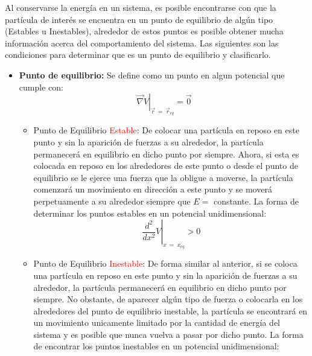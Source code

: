 \documentclass[/home/hernan/Documentos/Apuntes_mecanica_teorica/main.tex]{subfiles}
\begin{document}
	\begin{definition}
		
		Al conservarse la energía en un sistema, es posible encontrarse con que la partícula de interés se encuentra en un punto de equilibrio de algún tipo (Estables u Inestables), alrededor de estos puntos es posible obtener mucha información acerca del comportamiento del sistema. Las siguientes son las condiciones para determinar que es un punto de equilibrio y clasificarlo.

		\begin{itemize}
			\item \textbf{Punto de equilibrio: } Se define como un punto en algun potencial que cumple con: \\ 
				\begin{equation}
				\left .  \vec{\nabla }V \right|_{\vec{r} \: = \: \vec{r}_{eq}} = \vec{0}
				\end{equation}
			\begin{itemize}
				\item Punto de Equilibrio \textcolor{red}{Estable}: De colocar una partícula en reposo en este punto y sin la aparición de fuerzas a su alrededor, la partícula permanecerá en equilibrio en dicho punto por siempre. Ahora, si esta es colocada en reposo en los alrededores de este punto o desde el punto de equilibrio se le ejerce una fuerza que la obligue a moverse, la partícula comenzará un movimiento en dirección a este punto y se moverá perpetuamente a su alrededor siempre que $E =$ constante. La forma de determinar los puntos estables en un potencial unidimensional: \\ 
				\begin{equation}
					\left .  \frac{d^2}{dx^2}V \right|_{x \: = \: x_{eq}} > 0 
					\label{eq: puntoestable}
				\end{equation}
				\item Punto de Equilibrio \textcolor{red}{Inestable}: De forma similar al anterior, si se coloca una partícula en reposo en este punto y sin la aparición de fuerzas a su alrededor, la partícula permanecerá en equilibrio en dicho punto por siempre. No obstante, de aparecer algún tipo de fuerza o colocarla en los alrededores del punto de equilibrio inestable, la partícula se encontrará en un movimiento unicamente limitado por la cantidad de energía del sistema y es posible que nunca vuelva a pasar por dicho punto. La forma de encontrar los puntos inestables en un potencial unidimensional: \\  

\end{itemize}
\end{itemize}
\end{definition}
\end{document}
